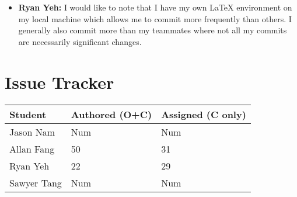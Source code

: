 \documentclass{article}
\begin{document}

\begin{itemize}
  \item \textbf{Ryan Yeh:} I would like to note that I have my own \LaTeX{} environment on my local machine
  which allows me to commit more frequently than others. I generally also commit more than my teammates where
  not all my commits are necessarily significant changes.
\end{itemize}


\section{Issue Tracker}


\begin{table}[H]
\centering
\begin{tabular}{lll}
\toprule
\textbf{Student} & \textbf{Authored (O+C)} & \textbf{Assigned (C only)}\\
\midrule
Jason Nam & Num & Num \\
Allan Fang & 50 & 31 \\
Ryan Yeh & 22 & 29 \\
Sawyer Tang & Num & Num \\
\bottomrule
\end{tabular}
\end{table}

\end{document}
